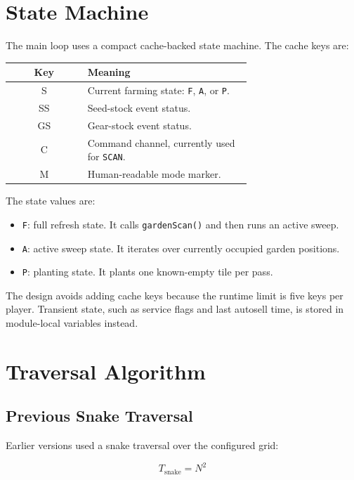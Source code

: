 \documentclass[11pt]{article}
\begin{document}
\section{State Machine}

The main loop uses a compact cache-backed state machine. The cache keys are:

\begin{center}
\begin{tabular}{>{\ttfamily}c p{0.68\linewidth}}
\toprule
Key & Meaning \\
\midrule
S & Current farming state: \texttt{F}, \texttt{A}, or \texttt{P}. \\
SS & Seed-stock event status. \\
GS & Gear-stock event status. \\
C & Command channel, currently used for \texttt{SCAN}. \\
M & Human-readable mode marker. \\
\bottomrule
\end{tabular}
\end{center}

The state values are:

\begin{itemize}
    \item \texttt{F}: full refresh state. It calls \texttt{gardenScan()} and then runs an active sweep.
    \item \texttt{A}: active sweep state. It iterates over currently occupied garden positions.
    \item \texttt{P}: planting state. It plants one known-empty tile per pass.
\end{itemize}

The design avoids adding cache keys because the runtime limit is five keys per
player. Transient state, such as service flags and last autosell time, is stored
in module-local variables instead.

\section{Traversal Algorithm}

\subsection{Previous Snake Traversal}

Earlier versions used a snake traversal over the configured grid:

\[
T_{\text{snake}} = N^2
\]
\end{document}
